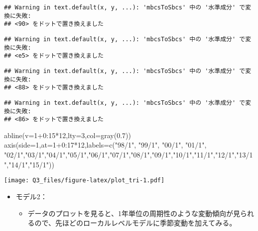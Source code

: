 \documentclass[]{article}
\newenvironment{Shaded}{\begin{snugshade}}{\end{snugshade}}
\newcommand{\AttributeTok}[1]{\textcolor[rgb]{0.77,0.63,0.00}{#1}}
\newcommand{\DecValTok}[1]{\textcolor[rgb]{0.00,0.00,0.81}{#1}}
\newcommand{\FloatTok}[1]{\textcolor[rgb]{0.00,0.00,0.81}{#1}}
\newcommand{\FunctionTok}[1]{\textcolor[rgb]{0.00,0.00,0.00}{#1}}
\newcommand{\NormalTok}[1]{#1}
\newcommand{\SpecialCharTok}[1]{\textcolor[rgb]{0.00,0.00,0.00}{#1}}
\newcommand{\StringTok}[1]{\textcolor[rgb]{0.31,0.60,0.02}{#1}}
\providecommand{\tightlist}{%
  \setlength{\itemsep}{0pt}\setlength{\parskip}{0pt}}
\begin{document}
\begin{verbatim}
## Warning in text.default(x, y, ...): 'mbcsToSbcs' 中の '水準成分' で変換に失敗:
## <90> をドットで置き換えました
\end{verbatim}

\begin{verbatim}
## Warning in text.default(x, y, ...): 'mbcsToSbcs' 中の '水準成分' で変換に失敗:
## <e5> をドットで置き換えました
\end{verbatim}

\begin{verbatim}
## Warning in text.default(x, y, ...): 'mbcsToSbcs' 中の '水準成分' で変換に失敗:
## <88> をドットで置き換えました
\end{verbatim}

\begin{verbatim}
## Warning in text.default(x, y, ...): 'mbcsToSbcs' 中の '水準成分' で変換に失敗:
## <86> をドットで置き換えました
\end{verbatim}

\begin{Shaded}
\begin{Highlighting}[]
\FunctionTok{abline}\NormalTok{(}\AttributeTok{v=}\DecValTok{1}\SpecialCharTok{+}\DecValTok{0}\SpecialCharTok{:}\DecValTok{15}\SpecialCharTok{*}\DecValTok{12}\NormalTok{,}\AttributeTok{lty=}\DecValTok{3}\NormalTok{,}\AttributeTok{col=}\FunctionTok{gray}\NormalTok{(}\FloatTok{0.7}\NormalTok{))}
\FunctionTok{axis}\NormalTok{(}\AttributeTok{side=}\DecValTok{1}\NormalTok{,}\AttributeTok{at=}\DecValTok{1}\SpecialCharTok{+}\DecValTok{0}\SpecialCharTok{:}\DecValTok{17}\SpecialCharTok{*}\DecValTok{12}\NormalTok{,}\AttributeTok{labels=}\FunctionTok{c}\NormalTok{(}\StringTok{"98/1"}\NormalTok{, }\StringTok{"99/1"}\NormalTok{, }\StringTok{"00/1"}\NormalTok{, }\StringTok{"01/1"}\NormalTok{, }\StringTok{"02/1"}\NormalTok{,}\StringTok{"03/1"}\NormalTok{,}\StringTok{"04/1"}\NormalTok{,}\StringTok{"05/1"}\NormalTok{,}\StringTok{"06/1"}\NormalTok{,}\StringTok{"07/1"}\NormalTok{,}\StringTok{"08/1"}\NormalTok{,}\StringTok{"09/1"}\NormalTok{,}\StringTok{"10/1"}\NormalTok{,}\StringTok{"11/1"}\NormalTok{,}\StringTok{"12/1"}\NormalTok{,}\StringTok{"13/1"}\NormalTok{,}\StringTok{"14/1"}\NormalTok{,}\StringTok{"15/1"}\NormalTok{))}
\end{Highlighting}
\end{Shaded}

\texttt{[image: Q3\_files/figure-latex/plot\_tri-1.pdf]}

\begin{itemize}
\tightlist
\item
  モデル2：

  \begin{itemize}
  \tightlist
  \item
    データのプロットを見ると、1年単位の周期性のような変動傾向が見られるので、先ほどのローカルレベルモデルに季節変動を加えてみる。
  \end{itemize}
\end{itemize}
\end{document}
